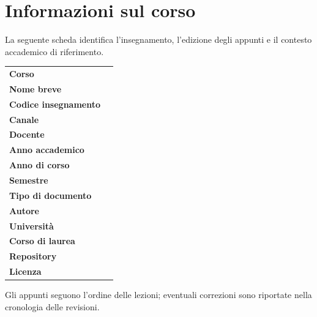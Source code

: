 \documentclass{../../../unipd-notes}
\begin{document}
\chapter*{Informazioni sul corso}

La seguente scheda identifica l'insegnamento, l'edizione degli appunti e il contesto accademico di riferimento.

\begin{tabularx}{\textwidth}{>{\bfseries\sffamily}lL}
  Corso &  \\
  Nome breve &  \\
  Codice insegnamento &  \\
  Canale &  \\
  Docente &  \\
  Anno accademico &  \\
  Anno di corso &  \\
  Semestre &  \\
  Tipo di documento &  \\
  Autore &  \\
  Università &  \\
  Corso di laurea &  \\
  Repository &  \\
  Licenza &  \\
\end{tabularx}

\begin{remark}
Gli appunti seguono l'ordine delle lezioni; eventuali correzioni sono riportate nella cronologia delle revisioni.
\end{remark}
\end{document}
